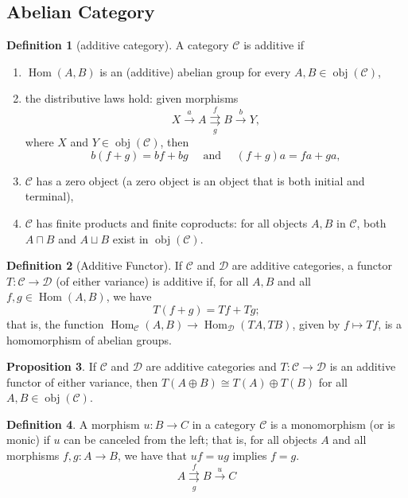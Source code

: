 \documentclass[a4paper,12pt]{article}
\theoremstyle{definition}
\newtheorem{defn}{Definition}[subsection]
\newtheorem{prop}[defn]{Proposition}
\begin{document}
\subsection{Abelian Category}
\begin{defn}[additive category]
    A category $\mathcal{C}$ is additive if
    \begin{enumerate}[(1)]
        \item $\operatorname{Hom}(A, B)$ is an (additive) abelian group for every $A, B \in \operatorname{obj}(\mathcal{C})$,
        \item  the distributive laws hold: given morphisms
              $$
                  X \xrightarrow{a} A \underset{g}{\stackrel{f}{\rightrightarrows}} B \xrightarrow{b} Y,
              $$
              where $X$ and $Y \in \operatorname{obj}(\mathcal{C})$, then
              $$
                  b(f+g)=b f+b g \quad \text { and } \quad(f+g) a=f a+g a,
              $$
        \item  $\mathcal{C}$ has a zero object (a zero object is an object that is both initial and terminal),
        \item  $\mathcal{C}$ has finite products and finite coproducts: for all objects $A, B$ in $\mathcal{C}$, both $A \sqcap B$ and $A \sqcup B$ exist in $\operatorname{obj}(\mathcal{C})$.
    \end{enumerate}
\end{defn}
\begin{defn}[Additive Functor]
    If $\mathcal{C}$ and $\mathcal{D}$ are additive categories, a functor $T: \mathcal{C} \rightarrow \mathcal{D}$ (of either variance) is additive if, for all $A, B$ and all $f, g \in \operatorname{Hom}(A, B)$, we have
    $$
        T(f+g)=T f+T g ;
    $$
    that is, the function $\operatorname{Hom}_{\mathcal{C}}(A, B) \rightarrow \operatorname{Hom}_{\mathcal{D}}(T A, T B)$, given by $f \mapsto T f$, is a homomorphism of abelian groups.
\end{defn}
\begin{prop}
    If $\mathcal{C}$ and $\mathcal{D}$ are additive categories and $T: \mathcal{C} \rightarrow \mathcal{D}$ is an additive functor of either variance, then $T(A \oplus B) \cong T(A) \oplus T(B)$ for all $A, B \in \operatorname{obj}(\mathcal{C})$.
\end{prop}
\begin{defn}
    A morphism $u: B \rightarrow C$ in a category $\mathcal{C}$ is a monomorphism (or is monic) if $u$ can be canceled from the left; that is, for all objects $A$ and all morphisms $f, g: A \rightarrow B$, we have that $u f=u g$ implies $f=g$.
    $$
        A \underset{g}{\stackrel{f}{\rightrightarrows}} B \xrightarrow{u} C
    $$
\end{defn}
\end{document}

